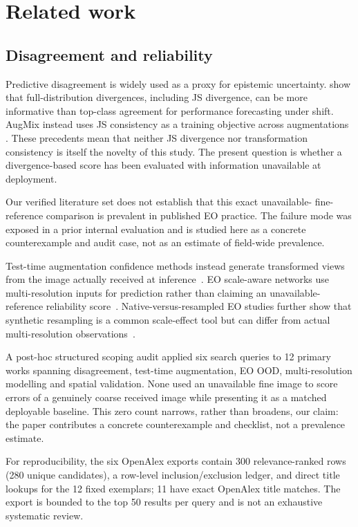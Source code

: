 \section{Related work}

\subsection{Disagreement and reliability}

Predictive disagreement is widely used as a proxy for epistemic uncertainty.
\citet{schirmer2023divergence} show that full-distribution divergences, including
JS divergence, can be more informative than top-class agreement for performance
forecasting under shift. AugMix instead uses JS consistency as a training
objective across augmentations \citep{hendrycks2020augmix}. These precedents
mean that neither JS divergence nor transformation consistency is itself the
novelty of this study. The present question is whether a divergence-based score
has been evaluated with information unavailable at deployment.

Our verified literature set does not establish that this exact unavailable-
fine-reference comparison is prevalent in published EO practice. The failure
mode was exposed in a prior internal evaluation and is studied here as a
concrete counterexample and audit case, not as an estimate of field-wide
prevalence.

Test-time augmentation confidence methods instead generate transformed views
from the image actually received at inference~\citep{bahat2020tta,conde2023atta}.
EO scale-aware networks use multi-resolution inputs for prediction rather than
claiming an unavailable-reference reliability score~\citep{wang2021sanet}.
Native-versus-resampled EO studies further show that synthetic resampling is a
common scale-effect tool but can differ from actual multi-resolution
observations~\citep{li2023scaleeffect,xu2019upscaling}.

A post-hoc structured scoping audit applied six search queries to 12 primary
works spanning disagreement, test-time augmentation, EO OOD, multi-resolution
modelling and spatial validation. None used an unavailable fine image to score
errors of a genuinely coarse received image while presenting it as a matched
deployable baseline. This zero count narrows, rather than broadens, our claim:
the paper contributes a concrete counterexample and checklist, not a prevalence
estimate.

For reproducibility, the six OpenAlex exports contain 300 relevance-ranked
rows (280 unique candidates), a row-level inclusion/exclusion ledger, and direct
title lookups for the 12 fixed exemplars; 11 have exact OpenAlex title matches.
The export is bounded to the top 50 results per query and is not an exhaustive
systematic review.

